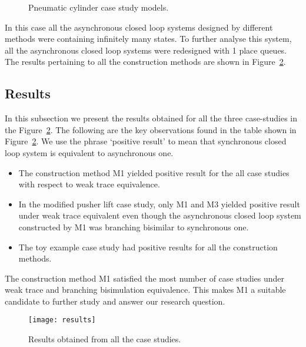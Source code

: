 \documentclass[a4paper,english,final]{article}
\theoremstyle{plain}
\theoremstyle{definition}
\begin{document}
\begin{figure}
\hspace{1cm}
\caption{Pneumatic cylinder case study models.}\label{pneumatic}
\end{figure}

In this case all the asynchronous closed loop systems designed by different methods were containing infinitely many states. To further analyse this system, all the asynchronous closed loop systems were redesigned with 1 place queues. The results pertaining to all the construction methods are shown in Figure~\ref{results}.

\subsection{Results}\label{subsec-results}
In this subsection we present the results obtained for all the three case-studies in the Figure~\ref{results}. The following are the key observations found in the table shown in Figure~\ref{results}. We use the phrase `positive result' to mean that synchronous closed loop system is equivalent to asynchronous one.
\begin{itemize}
\item The construction method M1 yielded positive result for the all case studies with respect to weak trace equivalence.
\item In the modified pusher lift case study, only M1 and M3 yielded positive result under weak trace equivalent even though the asynchronous closed loop system constructed by M1 was branching bisimilar to synchronous one.
\item The toy example case study had positive results for all the construction methods.
\end{itemize}
The construction method M1 satisfied the most number of case studies under weak trace and branching bisimulation equivalence. This makes M1 a suitable candidate to further study and answer our research question.

\begin{figure}\centering
\texttt{[image: results]}
\caption{Results obtained from all the case studies.}\label{results}
\end{figure}
\end{document}
